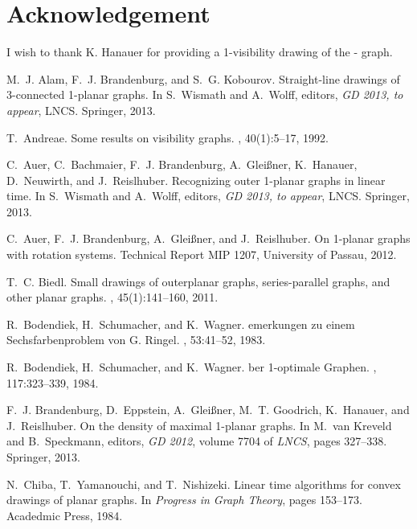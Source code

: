 \documentclass[runningheads]{llncs}
\begin{document}
\section{Acknowledgement}
I wish to thank K. Hanauer for providing a 1-visibility drawing of
the  - graph.



\begin{thebibliography}{10}

M.~J. Alam, F.~J. Brandenburg, and S.~G. Kobourov.
\newblock Straight-line drawings of 3-connected 1-planar graphs.
\newblock In S.~Wismath and A.~Wolff, editors, {\em {GD} 2013, to appear},
  {LNCS}. Springer, 2013.

T.~Andreae.
\newblock Some results on visibility graphs.
, 40(1):5--17, 1992.

C.~Auer, C.~Bachmaier, F.~J. Brandenburg, A.~Glei\ss{}ner, K.~Hanauer,
  D.~Neuwirth, and J.~Reislhuber.
\newblock Recognizing outer 1-planar graphs in linear time.
\newblock In S.~Wismath and A.~Wolff, editors, {\em {GD} 2013, to appear},
  {LNCS}. Springer, 2013.

C.~Auer, F.~J. Brandenburg, A.~Glei{\ss}ner, and J.~Reislhuber.
\newblock On 1-planar graphs with rotation systems.
\newblock Technical Report MIP 1207, University of Passau, 2012.

T.~C. Biedl.
\newblock Small drawings of outerplanar graphs, series-parallel graphs, and
  other planar graphs.
, 45(1):141--160, 2011.

R.~Bodendiek, H.~Schumacher, and K.~Wagner.
emerkungen zu einem {S}echsfarbenproblem von {G}. {R}ingel.
, 53:41--52, 1983.

R.~Bodendiek, H.~Schumacher, and K.~Wagner.
ber 1-optimale {G}raphen.
, 117:323--339, 1984.

F.~J. Brandenburg, D.~Eppstein, A.~Glei{\ss}ner, M.~T. Goodrich, K.~Hanauer,
  and J.~Reislhuber.
\newblock On the density of maximal 1-planar graphs.
\newblock In M.~van Kreveld and B.~Speckmann, editors, {\em {GD} 2012}, volume
  7704 of {\em {LNCS}}, pages 327--338. Springer, 2013.

N.~Chiba, T.~Yamanouchi, and T.~Nishizeki.
\newblock Linear time algorithms for convex drawings of planar graphs.
\newblock In {\em {Progress in Graph Theory}}, pages 153--173. Acadedmic Press,
  1984.


\end{thebibliography}
\end{document}

